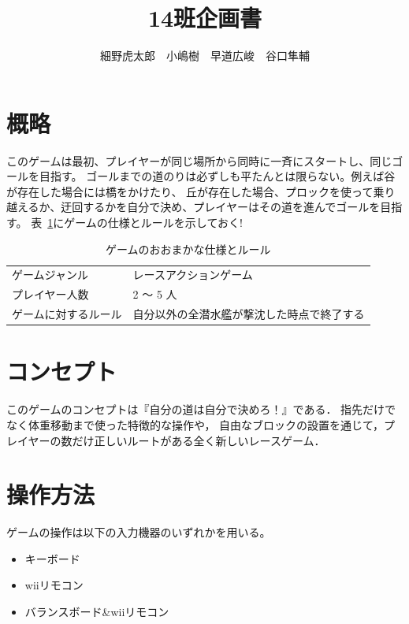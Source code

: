 \documentclass{jarticle}
\title{14班企画書}
\author{細野虎太郎　小嶋樹　早道広峻　谷口隼輔}
\begin{document}
\maketitle

\section{概略}
このゲームは最初、プレイヤーが同じ場所から同時に一斉にスタートし、同じゴールを目指す。
ゴールまでの道のりは必ずしも平たんとは限らない。例えば谷が存在した場合には橋をかけたり、
丘が存在した場合、プロックを使って乗り越えるか、迂回するかを自分で決め、プレイヤーはその道を進んでゴールを目指す。
表~\ref{table:rule}にゲームの仕様とルールを示しておく!
\begin{table}[h]
    \caption{ゲームのおおまかな仕様とルール}
    \label{table:rule}
    \begin{center}
    \begin{tabular}{|l|l|}\hline
    ゲームジャンル & レースアクションゲーム\\
    プレイヤー人数 & 2 ～ 5 人              \\
    ゲームに対するルール & 自分以外の全潜水艦が撃沈した時点で終了する \\ \hline
    \end{tabular}
    \end{center}
\end{table}

\section{コンセプト}
\label{コンセプト}
このゲームのコンセプトは『自分の道は自分で決めろ！』である．
指先だけでなく体重移動まで使った特徴的な操作や，
自由なブロックの設置を通じて，プレイヤーの数だけ正しいルートがある全く新しいレースゲーム．


\section{操作方法}
ゲームの操作は以下の入力機器のいずれかを用いる。
\begin{itemize}
    \item キーボード
    \item wiiリモコン
    \item バランスボード\&wiiリモコン
\end{itemize}
\end{document}

